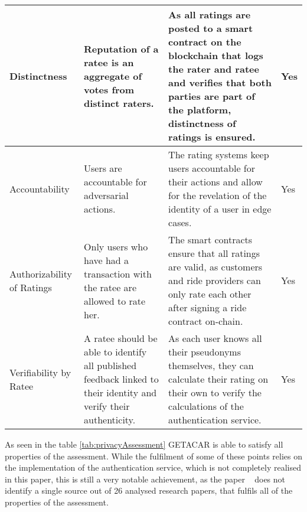 \begin{longtable}{|p{3cm}|p{4.5cm}|p{5cm}|p{1.5cm}|}
\hline
Distinctness & Reputation of a ratee is an aggregate of votes from distinct raters. & As all ratings are posted to a smart contract on the blockchain that logs the rater and ratee and verifies that both parties are part of the platform, distinctness of ratings is ensured. & Yes\\
\hline
Accountability & Users are accountable for adversarial actions. & The rating systems keep users accountable for their actions and allow for the revelation of the identity of a user in edge cases.& Yes\\
\hline
Authorizability of Ratings & Only users who have had a transaction with the ratee are allowed to rate her. & The smart contracts ensure that all ratings are valid, as customers and ride providers can only rate each other after signing a ride contract on-chain.& Yes\\
\hline
Verifiability by Ratee & A ratee should be able to identify all published feedback linked to their identity and verify their authenticity. &As each user knows all their pseudonyms themselves, they can calculate their rating on their own to verify the calculations of the authentication service.  & Yes\\
\hline
\end{longtable}

As seen in the table \ref{tab:privacyAssessment} GETACAR is able to satisfy all properties of the assessment. While the fulfilment of some of these points relies on the implementation of the authentication service, which is not completely realised in this paper, this is still a very notable achievement, as the paper ~\cite{HasanOmar} does not identify a single source out of 26 analysed research papers, that fulfils all of the properties of the assessment.  